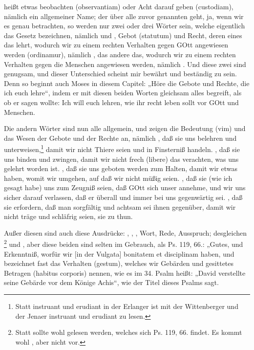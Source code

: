  heißt etwas beobachten (observantiam) oder Acht darauf geben (custodiam), nämlich ein allgemeiner Name; der über alle zuvor genannten geht, ja, wenn wir es genau betrachten, so werden nur zwei oder drei Wörter sein, welche eigentlich das Gesetz bezeichnen, nämlich  und , Gebot (statutum) und Recht, deren eines das lehrt, wodurch wir zu einem rechten Verhalten gegen GOtt angewiesen werden (ordinamur), nämlich , das andere das, wodurch wir zu einem rechten Verhalten gegen die Menschen angewiesen werden, nämlich . Und diese zwei sind genugsam, und dieser Unterschied scheint mir bewährt und beständig zu sein. Denn so beginnt auch Moses in diesem Capitel: „Höre die Gebote und Rechte, die ich euch lehre“, indem er mit diesen beiden Worten gleichsam alles begreift, als ob er sagen wollte: Ich will euch lehren, wie ihr recht leben sollt vor GOtt und Menschen.

Die andern Wörter sind nun alle allgemein, und zeigen die Bedeutung (vim) und das Wesen der Gebote und der Rechte an, nämlich , daß sie uns belehren und unterweisen,\footnote{Statt instruant und erudiant in der Erlanger ist mit der Wittenberger und der Jenaer instruant und erudiant zu lesen.} damit
wir nicht Thiere seien und in Finsterniß handeln. , daß sie uns binden und zwingen, damit wir nicht frech (libere) das verachten, was uns gelehrt worden ist. , daß sie uns geboten werden zum Halten, damit wir etwas haben, womit wir umgehen, auf daß wir nicht müßig seien. , daß sie (wie ich gesagt habe) uns zum Zeugniß seien, daß GOtt sich unser annehme, und wir uns sicher darauf verlassen, daß er überall und immer bei uns gegenwärtig sei. , daß sie erfordern, daß man sorgfältig und achtsam sei ihnen gegenüber, damit wir nicht träge und schläfrig seien, sie zu thun.

Außer diesen sind auch diese Ausdrücke: , , , Wort, Rede, Ausspruch; desgleichen \footnote{Statt  sollte wohl  gelesen werden, welches sich Ps. 119, 66. findet. Es kommt wohl , aber nicht  vor.} und , aber diese beiden sind selten im Gebrauch, als Ps. 119, 66.: „Gutes,  und Erkenntniß, worfür wir [in der Vulgata] bonitatem et disciplinam haben, und bezeichnet fast das Verhalten (gestum), welches wir Gebärden und gesittetes Betragen (habitus corporis) nennen, wie es im 34. Psalm heißt: „David verstellte seine Gebärde vor dem Könige Achis“, wie der Titel dieses Psalms sagt.

